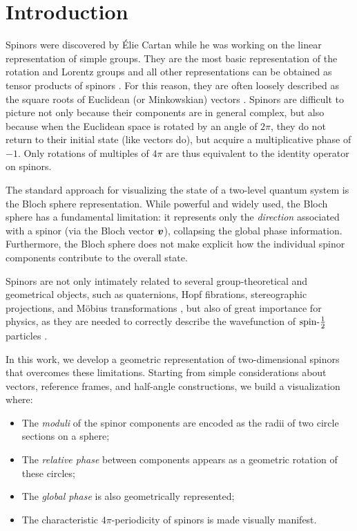 \section{\label{sec:introduction} Introduction}

Spinors were discovered by {\'E}lie Cartan \cite{Cartan1913groupes}
while he was working on the linear representation of simple groups.
They are the most basic representation of the
rotation and Lorentz groups and all other representations can be obtained
as tensor products of spinors \cite{cartan2012theory}.
For this reason, they are often loosely described as the square
roots of Euclidean (or Minkowskian) vectors \cite{farmelo2009strangest}.
Spinors are difficult to picture not only because
their components are in general complex, but also because when the Euclidean space
is rotated by an angle of $2\pi$, they do not return to their initial state (like vectors do),
but acquire a multiplicative phase of $-1$. Only rotations
of multiples of $4\pi$ are thus equivalent to the identity operator on spinors.

The standard approach for visualizing the state of a two-level quantum system is the Bloch sphere representation. While powerful and widely used, the Bloch sphere has a fundamental limitation: it represents only the \emph{direction} associated with a spinor (via the Bloch vector $\bm{v}$), collapsing the global phase information. Furthermore, the Bloch sphere does not make explicit how the individual spinor components contribute to the overall state.

Spinors are not only intimately related to several group-theoretical
and geometrical objects, such as quaternions, Hopf fibrations,
stereographic projections, and M\"obius transformations
\cite{hanson2006visualizing,penrose1984spinors,needham2021visual},
but also of great importance for physics, as they are needed
to correctly describe the wavefunction of $\text{spin-}\frac{1}{2}$ particles
\cite{hladik1996spineurs,schwichtenberg2015physics}.

In this work, we develop a geometric representation of
two-dimensional spinors that overcomes these limitations.
Starting from simple considerations about vectors, reference
frames, and half-angle constructions, we build a visualization
where:
\begin{itemize}
    \item The \emph{moduli} of the spinor components are encoded as the radii of two circle sections on a sphere;
    \item The \emph{relative phase} between components appears as a geometric rotation of these circles;
    \item The \emph{global phase} is also geometrically represented;
    \item The characteristic $4\pi$-periodicity of spinors is made visually manifest.
\end{itemize}


